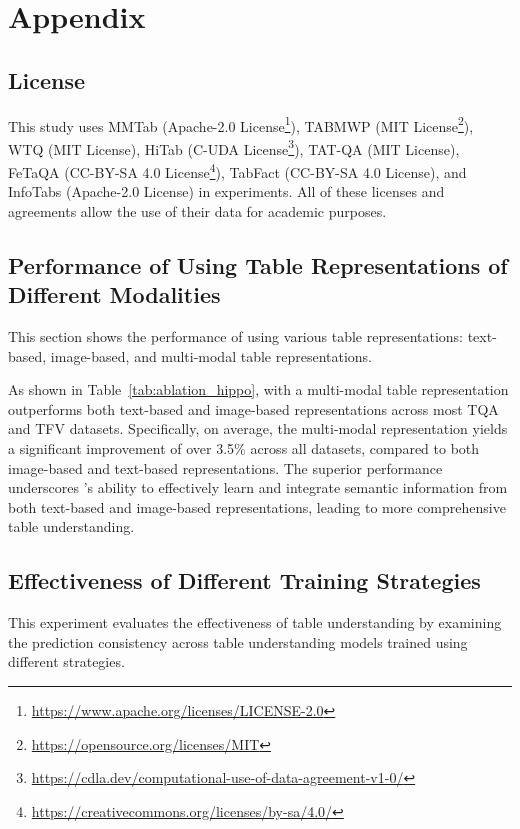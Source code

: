 
\section{Appendix}

\subsection{License}
This study uses MMTab (Apache-2.0 License\footnote{\href{https://www.apache.org/licenses/LICENSE-2.0}{https://www.apache.org/licenses/LICENSE-2.0}}), 
TABMWP (MIT License\footnote{\href{https://opensource.org/licenses/MIT}{https://opensource.org/licenses/MIT}}), 
WTQ (MIT License), 
HiTab (C-UDA License\footnote{\href{https://cdla.dev/computational-use-of-data-agreement-v1-0/}{https://cdla.dev/computational-use-of-data-agreement-v1-0/}}), 
TAT-QA (MIT License), 
FeTaQA (CC-BY-SA 4.0 License\footnote{\href{https://creativecommons.org/licenses/by-sa/4.0/}{https://creativecommons.org/licenses/by-sa/4.0/}}), 
TabFact (CC-BY-SA 4.0 License), 
and InfoTabs (Apache-2.0 License) in experiments. 
All of these licenses and agreements allow the use of their data for academic purposes.

\subsection{Performance of \method{} Using Table Representations of Different Modalities}
This section shows the performance of \method{} using various table representations: text-based, image-based, and multi-modal table representations.

As shown in Table~\ref{tab:ablation_hippo}, \method{} with a multi-modal table representation outperforms both text-based and image-based representations across most TQA and TFV datasets. Specifically, on average, the multi-modal representation yields a significant improvement of over 3.5\% across all datasets, compared to both image-based and text-based representations. The superior performance underscores \method{}'s ability to effectively learn and integrate semantic information from both text-based and image-based representations, leading to more comprehensive table understanding.

\subsection{Effectiveness of Different Training Strategies}
This experiment evaluates the effectiveness of table understanding by examining the prediction consistency across table understanding models trained using different strategies.

